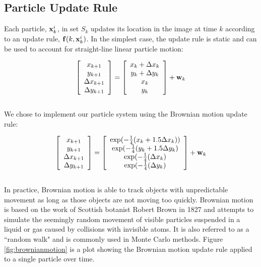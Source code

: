 \documentclass[11pt]{article}
\begin{document}
\subsection{Particle Update Rule}
\label{sec:updaterule}

Each particle, ${\bf x}^i_k$, in set $S_k$ updates its location in the image at time $k$ according to an update rule, ${\bf f}(k,{\bf x}^i_k)$. In the simplest case, the update rule is static and can be used to account for straight-line linear particle motion:


\begin{equation}
\left [ \begin{array}{c}
x_{k+1} \\
y_{k+1} \\
\Delta x_{k+1} \\
\Delta y_{k+1} \end{array} \right ] 
=
\left [ \begin{array}{c}
x_k + \Delta x_k \\
y_k + \Delta y_k \\
x_k \\
y_k \end{array} \right ] 
+ {\bf w}_k
\label{eq:linearupdate}
\end{equation} \\

We chose to implement our particle system using the Brownian motion update rule:

\begin{equation}
\left [ \begin{array}{c}
x_{k+1} \\
y_{k+1} \\
\Delta x_{k+1} \\
\Delta y_{k+1} \end{array} \right ] 
=
\left [ \begin{array}{c}
\text{exp}(-\frac{1}{4}(x_k+1.5 \Delta x_k)) \\
\text{exp}(-\frac{1}{4}(y_k+1.5 \Delta y_k) \\
\text{exp}(-\frac{1}{4}(\Delta x_k) \\
\text{exp}(-\frac{1}{4}(\Delta y_k) \end{array} \right ] 
+ {\bf w}_k
\label{eq:brownianupdate}
\end{equation} \\

In practice, Brownian motion is able to track objects with unpredictable movement as long as those objects are not moving too quickly. Brownian motion is based on the work of Scottish botanist Robert Brown in 1827 and attempts to simulate the seemingly random movement of visible particles suspended in a liquid or gas caused by collisions with invisible atoms. It is also referred to as a ``random walk" and is commonly used in Monte Carlo methods. Figure \ref{fig:brownianmotion} is a plot showing the Brownian motion update rule applied to a single particle over time.
\end{document}
